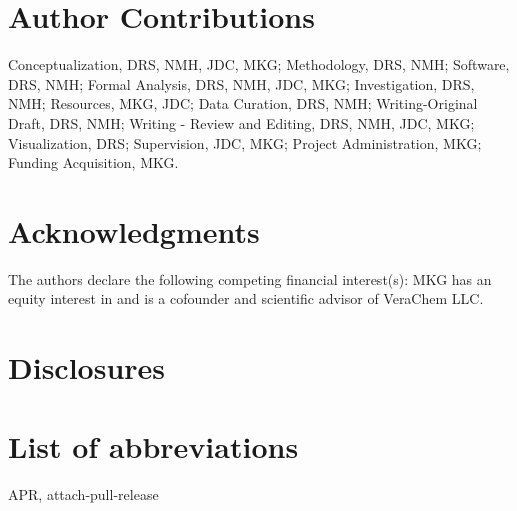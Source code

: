 \documentclass[9pt,lineno]{elife}
\begin{document}
\section{Author Contributions}
Conceptualization, DRS, NMH, JDC, MKG; Methodology, DRS, NMH; Software, DRS, NMH; Formal Analysis, DRS, NMH, JDC, MKG; Investigation, DRS, NMH; Resources, MKG, JDC;  Data Curation, DRS, NMH; Writing-Original Draft, DRS, NMH; Writing - Review and Editing, DRS, NMH, JDC, MKG; Visualization, DRS; Supervision, JDC, MKG; Project Administration, MKG; Funding Acquisition, MKG.

\section{Acknowledgments}
The authors declare the following competing financial interest(s): MKG has an equity interest in and is a cofounder and scientific advisor of VeraChem LLC.
\section{Disclosures}




\appendix
\section{List of abbreviations}
APR, attach-pull-release
\end{document}

